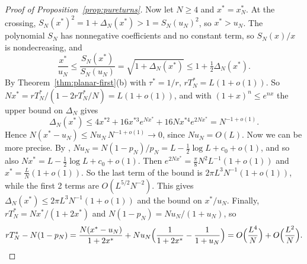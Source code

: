 \begin{proof}[Proof of Proposition~\ref{prop:pureturns}]
Now let $N\ge4$ and $x^*=x^*_N$. At the crossing, $S_N(x^*)^2=1+\Delta_N(x^*)>1=S_N(u_N)^2$, so
$x^*>u_N$. The polynomial $S_N$ has nonnegative coefficients and no constant term, so $S_N(x)/x$ is
nondecreasing, and
\[
 \frac{x^*}{u_N}\le\frac{S_N(x^*)}{S_N(u_N)}=\sqrt{1+\Delta_N(x^*)}\le1+\tfrac12\Delta_N(x^*).
\]
By Theorem~\ref{thm:planar-first}(b) with $\tau^*=1/r$, $rT^*_N=L(1+o(1))$. So
$Nx^*=rT^*_N/(1-2rT^*_N/N)=L(1+o(1))$, and with $(1+x)^n\le e^{nx}$ the upper bound on $\Delta_N$
gives
\[
 \Delta_N(x^*)\le4x^{*2}+16x^{*3}e^{Nx^*}+16Nx^{*4}e^{2Nx^*}=N^{-1+o(1)}.
\]
Hence $N(x^*-u_N)\le Nu_N\,N^{-1+o(1)}\to0$, since $Nu_N=O(L)$. Now we can be more precise. By
\cite[Eq.~(7)]{paperA}, $Nu_N=N(1-p_N)/p_N=L-\frac12\log L+c_0+o(1)$, and so also
$Nx^*=L-\frac12\log L+c_0+o(1)$. Then $e^{2Nx^*}=\frac\pi8N^2L^{-1}(1+o(1))$ and
$x^*=\frac LN(1+o(1))$. So the last term of the bound is $2\pi L^3N^{-1}(1+o(1))$, while the first 2
terms are $O(L^{5/2}N^{-2})$. This gives $\Delta_N(x^*)\le2\pi L^3N^{-1}(1+o(1))$ and the bound on
$x^*/u_N$. Finally, $rT^*_N=Nx^*/(1+2x^*)$ and $N(1-p_N)=Nu_N/(1+u_N)$, so
\[
 rT^*_N-N(1-p_N)=\frac{N(x^*-u_N)}{1+2x^*}+Nu_N\Bigl(\frac1{1+2x^*}-\frac1{1+u_N}\Bigr)
 =O\Bigl(\frac{L^4}N\Bigr)+O\Bigl(\frac{L^2}N\Bigr).
 \qedhere
\]
\end{proof}
